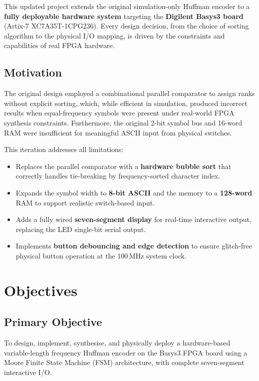 \documentclass[12pt,a4paper]{article}
\begin{document}
This updated project extends the original simulation-only Huffman encoder to a
\textbf{fully deployable hardware system} targeting the \textbf{Digilent Basys3 board}
(Artix-7 XC7A35T-1CPG236). Every design decision, from the choice of sorting algorithm
to the physical I/O mapping, is driven by the constraints and capabilities of real FPGA
hardware.

\subsection{Motivation}
The original design employed a combinational parallel comparator to assign ranks without
explicit sorting, which, while efficient in simulation, produced incorrect results when
equal-frequency symbols were present under real-world FPGA synthesis constraints.
Furthermore, the original 2-bit symbol bus and 16-word RAM were insufficient for
meaningful ASCII input from physical switches.

This iteration addresses all limitations:
\begin{itemize}
  \item Replaces the parallel comparator with a \textbf{hardware bubble sort} that
        correctly handles tie-breaking by frequency-sorted character index.
  \item Expands the symbol width to \textbf{8-bit ASCII} and the memory to a
        \textbf{128-word} RAM to support realistic switch-based input.
  \item Adds a fully wired \textbf{seven-segment display} for real-time interactive
        output, replacing the LED single-bit serial output.
  \item Implements \textbf{button debouncing and edge detection} to ensure glitch-free
        physical button operation at the 100\,MHz system clock.
\end{itemize}

\section{Objectives}

\subsection{Primary Objective}
To design, implement, synthesise, and physically deploy a hardware-based variable-length
frequency Huffman encoder on the Basys3 FPGA board using a Moore Finite State Machine
(FSM) architecture, with complete seven-segment interactive I/O.
\end{document}
